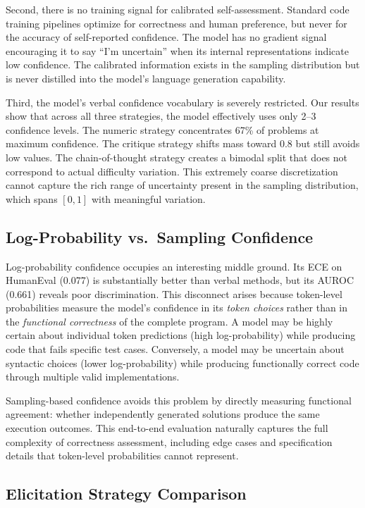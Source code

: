 \documentclass{article}
\begin{document}
Second, there is no training signal for calibrated self-assessment. Standard code training pipelines optimize for correctness and human preference, but never for the accuracy of self-reported confidence. The model has no gradient signal encouraging it to say ``I'm uncertain'' when its internal representations indicate low confidence. The calibrated information exists in the sampling distribution but is never distilled into the model's language generation capability.

Third, the model's verbal confidence vocabulary is severely restricted. Our results show that across all three strategies, the model effectively uses only 2--3 confidence levels. The numeric strategy concentrates 67\% of problems at maximum confidence. The critique strategy shifts mass toward 0.8 but still avoids low values. The chain-of-thought strategy creates a bimodal split that does not correspond to actual difficulty variation. This extremely coarse discretization cannot capture the rich range of uncertainty present in the sampling distribution, which spans $[0, 1]$ with meaningful variation.

\subsection{Log-Probability vs.\ Sampling Confidence}
\label{sec:logp_vs_samp}

Log-probability confidence occupies an interesting middle ground. Its ECE on HumanEval (0.077) is substantially better than verbal methods, but its AUROC (0.661) reveals poor discrimination. This disconnect arises because token-level probabilities measure the model's confidence in its \emph{token choices} rather than in the \emph{functional correctness} of the complete program. A model may be highly certain about individual token predictions (high log-probability) while producing code that fails specific test cases. Conversely, a model may be uncertain about syntactic choices (lower log-probability) while producing functionally correct code through multiple valid implementations.

Sampling-based confidence avoids this problem by directly measuring functional agreement: whether independently generated solutions produce the same execution outcomes. This end-to-end evaluation naturally captures the full complexity of correctness assessment, including edge cases and specification details that token-level probabilities cannot represent.

\subsection{Elicitation Strategy Comparison}
\label{sec:elicitation}
\end{document}
